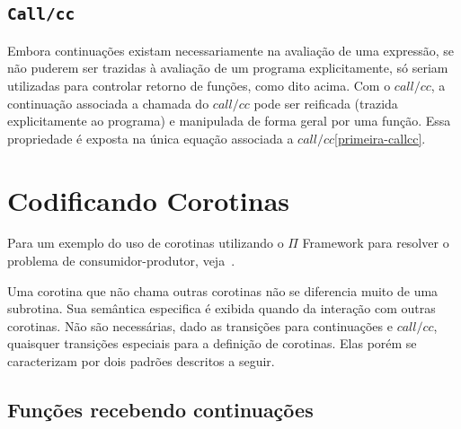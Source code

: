 \subsection{\texttt{Call/cc}\label{call/cc}}

Embora continuações existam necessariamente na avaliação de uma expressão, se não puderem ser trazidas à avaliação de um programa explicitamente, só seriam utilizadas para controlar retorno de funções, como dito acima. Com o \texttt{$\mathit{call/cc}$}, a continuação associada a chamada do \texttt{$\mathit{call/cc}$} pode ser reificada (trazida explicitamente ao programa) e manipulada de forma geral por uma função. Essa propriedade é exposta na única equação associada a $\mathit{call/cc}$\ref{primeira-callcc}.

\section{Codificando Corotinas}\label{secao3.2}

Para um exemplo do uso de corotinas utilizando o $\Pi$ Framework para resolver o problema de consumidor-produtor, veja~\cite{piLibSemantic}.

Uma corotina que não chama outras corotinas não se diferencia muito de uma subrotina. Sua semântica especifica é exibida quando da interação com outras
corotinas. Não são necessárias, dado as transições para continuações e $\mathit{call/cc}$, quaisquer transições especiais para a definição de corotinas. Elas porém se caracterizam por dois padrões descritos a seguir.

\subsection{Funções recebendo continuações}




